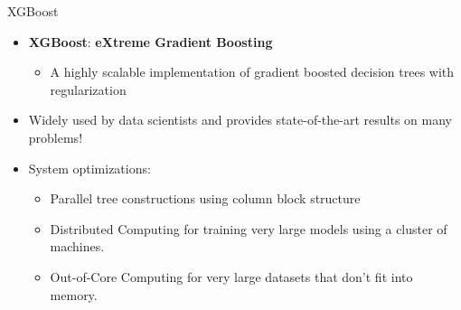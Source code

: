 \begin{frame}{XGBoost}

\begin{itemize}
    \item \textbf{XGBoost}: \textbf{eXtreme Gradient Boosting}
    \begin{itemize}
        \item A highly scalable implementation of gradient boosted decision trees with regularization
    \end{itemize}

    \item Widely used by data scientists and provides state-of-the-art results on many problems!

    \item System optimizations:
    \begin{itemize}
        \item Parallel tree constructions using column block structure
        \item Distributed Computing for training very large models using a cluster of machines.
        \item Out-of-Core Computing for very large datasets that don’t fit into memory.
    \end{itemize}
\end{itemize}

\end{frame}

